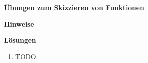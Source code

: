 



\begin{center}
  {\bf {\large Übungen zum Skizzieren von Funktionen}}
\end{center}



\begin{enumerate}











\bigskip

\end{enumerate}

\newpage


\begin{center}
    {\bf {\large Hinweise}}
\end{center}



\newpage


\begin{center}
{\bf {\large Lösungen}}
\end{center}

\begin{enumerate}

\item TODO

% 

% 

% 

% 

% 

\end{enumerate}



